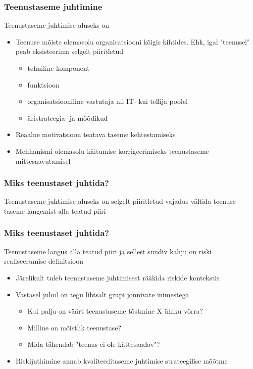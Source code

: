 \begin{frame}[fragile]
  \frametitle{Teenustaseme juhtimine}
	Teenustaseme juhtimise aluseks on 
		\begin{itemize}
			\item Teenuse mõiste olemasolu organisatsiooni kõigis kihtides. Ehk, igal "teenusel" peab eksisteerima selgelt piiritletud
			\begin{itemize}
				\item tehniline komponent
				\item funktsioon
				\item organisatsiooniline vastutaja nii IT- kui tellija poolel
				\item äristrateegia- ja mõõdikud
			\end{itemize}		
			\item Reaalne motivatsioon teatava taseme kehtestamiseks
			\item Mehhanismi olemasolu käitumise korrigeerimiseks teenustaseme mittesaavutamisel
		\end{itemize}		
\end{frame}

\begin{frame}[fragile]
  \frametitle{Miks teenustaset juhtida?}
	\begin{center}
		Teenustaseme juhtimise aluseks on selgelt piiritletud vajadus vältida teenuse taseme langemist alla teatud piiri
	\end{center}
\end{frame}


\begin{frame}[fragile]
  \frametitle{Miks teenustaset juhtida?}
  	Teenustaseme langus alla teatud piiri ja sellest sündiv kahju on riski realiseerumise definitsioon
		\begin{itemize}
			\item Järelikult tuleb teenustaseme juhtimisest rääkida riskide kontekstis
			\item Vastasel juhul on tegu lihtsalt grupi jonnivate inimestega
			\begin{itemize}
				\item Kui palju on väärt teenustaseme tõstmine X ühiku võrra?
				\item Milline on mõistlik teenustase?
				\item Mida tähendab "teenus ei ole kättesaadav"?
			\end{itemize}
			\item Riskijuthimine annab kvaliteeditaseme juhtimise strateegilise mõõtme 
		\end{itemize}		
\end{frame}

